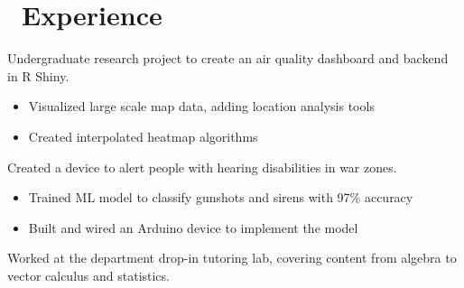 \documentclass{resume}
\begin{document}
\section{\faUsers\ Experience}
Undergraduate research project to create an air quality dashboard and backend in R Shiny.
\begin{itemize}
  \item Visualized large scale map data, adding location analysis tools
  \item Created interpolated heatmap algorithms
\end{itemize}

Created a device to alert people with hearing disabilities in war zones.
\begin{itemize}
  \item Trained ML model to classify gunshots and sirens with 97\% accuracy
  \item Built and wired an Arduino device to implement the model
\end{itemize}

Worked at the department drop-in tutoring lab, covering content from algebra to vector calculus and statistics. 
\end{document}
